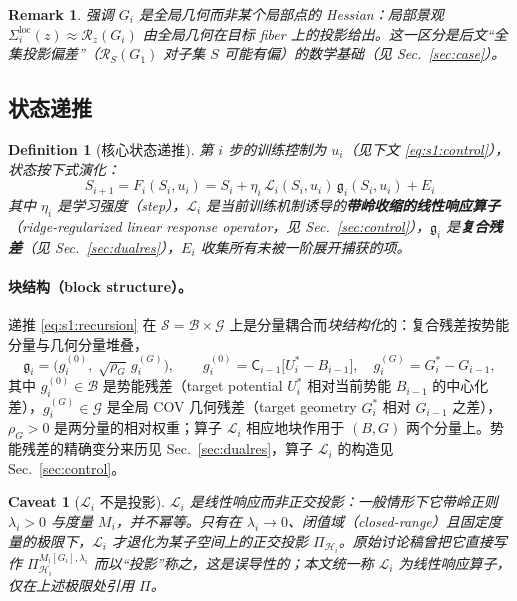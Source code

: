 \documentclass[11pt,a4paper]{article}
\newtheorem{definition}[theorem]{Definition}
\newtheorem{remark}[theorem]{Remark}
\newtheorem{caveat}[theorem]{Caveat}
\newcommand{\cH}{\mathcal{H}}   %
\newcommand{\cL}{\mathcal{L}}   %
\newcommand{\cS}{\mathcal{S}}   %
\newcommand{\cG}{\mathcal{G}}   %
\newcommand{\cB}{\mathcal{B}}   %
\newcommand{\Rstr}{\mathcal{R}}     %
\newcommand{\Center}{\mathsf{C}}    %
\newcommand{\ProjectOp}{\Pi}        %
\newcommand{\gres}{\bm{\mathfrak{g}}} %
\begin{document}
\begin{remark}\label{rem:s1:global-not-local}
强调 $G_i$ 是\emph{全局}几何而非某个局部点的 Hessian：局部景观 $\Sigma_i^{\mathrm{loc}}(z)\approx\Rstr_z(G_i)$ 由全局几何在目标 fiber 上的投影给出。这一区分是后文“全集投影偏差”（$\Rstr_S(G_1)$ 对子集 $S$ 可能有偏）的数学基础（见 Sec.~\ref{sec:case}）。
\end{remark}

\subsection{状态递推}

\begin{definition}[核心状态递推]\label{def:s1:recursion}
第 $i$ 步的训练控制为 $u_i$（见下文 \eqref{eq:s1:control}），状态按下式演化：
\begin{equation}\label{eq:s1:recursion}
  \boxed{\;S_{i+1}=F_i(S_i,u_i)=S_i+\eta_i\,\cL_i(S_i,u_i)\,\gres_i(S_i,u_i)+E_i\;}
\end{equation}
其中 $\eta_i$ 是学习强度（step），$\cL_i$ 是当前训练机制诱导的\textbf{带岭收缩的线性响应算子}（ridge-regularized linear response operator，见 Sec.~\ref{sec:control}），$\gres_i$ 是\textbf{复合残差}（见 Sec.~\ref{sec:dualres}），$E_i$ 收集所有未被一阶展开捕获的项。
\end{definition}

\paragraph{块结构（block structure）。}递推 \eqref{eq:s1:recursion} 在 $\cS=\cB\times\cG$ 上是分量耦合而\emph{块结构化}的：复合残差按势能分量与几何分量堆叠，
\begin{equation}\label{eq:s1:gres-block}
  \gres_i=\bigl(g_i^{(0)},\;\sqrt{\rho_G}\,g_i^{(G)}\bigr),\qquad
  g_i^{(0)}=\Center_{i-1}\!\bigl[U_i^*-B_{i-1}\bigr],\quad
  g_i^{(G)}=G_i^*-G_{i-1},
\end{equation}
其中 $g_i^{(0)}\in\cB$ 是势能残差（target potential $U_i^*$ 相对当前势能 $B_{i-1}$ 的中心化差），$g_i^{(G)}\in\cG$ 是全局 COV 几何残差（target geometry $G_i^*$ 相对 $G_{i-1}$ 之差），$\rho_G>0$ 是两分量的相对权重；算子 $\cL_i$ 相应地块作用于 $(B,G)$ 两个分量上。势能残差的精确变分来历见 Sec.~\ref{sec:dualres}，算子 $\cL_i$ 的构造见 Sec.~\ref{sec:control}。

\begin{caveat}[$\cL_i$ 不是投影]\label{cav:s1:not-projection}
$\cL_i$ 是\emph{线性响应}而非正交投影：一般情形下它带岭正则 $\lambda_i>0$ 与度量 $M_i$，并\emph{不}幂等。只有在 $\lambda_i\to 0$、闭值域（closed-range）且固定度量的极限下，$\cL_i$ 才退化为某子空间上的正交投影 $\ProjectOp_{\cH_i}$。原始讨论稿曾把它直接写作 $\ProjectOp_{\cH_i}^{M_i[G_i],\lambda_i}$ 而以“投影”称之，这是误导性的；本文统一称 $\cL_i$ 为线性响应算子，仅在上述极限处引用 $\ProjectOp$。
\end{caveat}
\end{document}
